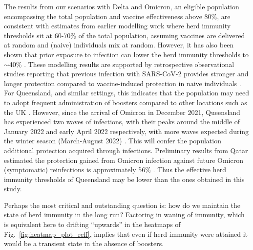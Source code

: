\documentclass[article, a4, authoryear]{elsarticle}
\begin{document}
The results from our scenarios with Delta and Omicron, an eligible population encompassing the total population and vaccine effectiveness above 80\%, are consistent with estimates from earlier modelling work \cite{gomes2022individual, britton2020mathematical} where herd immunity thresholds sit at 60-70\% of the total population, assuming vaccines are delivered at random and (naive) individuals mix at random. However, it has also been shown that prior exposure to infection can lower the herd immunity thresholds to $\sim$40\% \cite{britton2020mathematical}. These modelling results are supported by retrospective observational studies reporting that previous infection with SARS-CoV-2 provides stronger and longer protection compared to vaccine-induced protection in naive individuals \cite{gazit2021comparing}. For Queensland, and similar settings, this indicates that the population may need to adopt frequent administration of boosters compared to other locations such as the UK \cite{gomes2022individual}. However, since the arrival of Omicron in December 2021, Queensland has experienced two waves of infections, with their peaks around the middle of January 2022 and early April 2022 respectively, with more waves expected during the winter season (March-August 2022) \cite{qld-omicron-peak-2}. This will confer the population additional protection acquired through infections. Preliminary results from Qatar estimated the protection gained from Omicron infection against future Omicron (symptomatic) reinfections is approximately 56\% \cite{altarawneh2022protection}. Thus the effective herd immunity thresholds of Queensland may be lower than the ones obtained in this study. 

Perhaps the most critical and outstanding question is: how do we maintain the state of herd immunity in the long run? Factoring in waning of immunity, which is equivalent here to drifting ``upwards'' in the heatmaps of Fig.~\ref{fig:heatmap_plot_reff}, implies that even if herd immunity were attained it would be a transient state in the absence of boosters.
\end{document}
